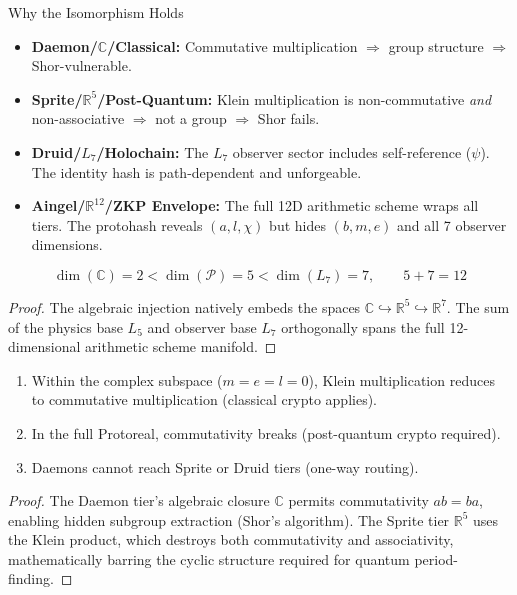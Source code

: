 \begin{aingelbox}{Why the Isomorphism Holds}
\begin{itemize}
    \item \textbf{Daemon/$\mathbb{C}$/Classical:} Commutative multiplication $\Rightarrow$ group structure $\Rightarrow$ Shor-vulnerable.
    \item \textbf{Sprite/$\mathbb{R}^5$/Post-Quantum:} Klein multiplication is non-commutative \emph{and} non-associative $\Rightarrow$ not a group $\Rightarrow$ Shor fails.
    \item \textbf{Druid/$L_7$/Holochain:} The $L_7$ observer sector includes self-reference ($\psi$). The identity hash is path-dependent and unforgeable.
    \item \textbf{Aingel/$\mathbb{R}^{12}$/ZKP Envelope:} The full 12D arithmetic scheme wraps all tiers. The protohash reveals $(a, l, \chi)$ but hides $(b, m, e)$ and all 7 observer dimensions.
\end{itemize}
\end{aingelbox}

\begin{theorem}
\begin{equation}
    \dim(\mathbb{C}) = 2 < \dim(\mathcal{P}) = 5 < \dim(L_7) = 7, \qquad 5 + 7 = 12
\end{equation}
\end{theorem}
\begin{proof}
The algebraic injection natively embeds the spaces $\mathbb{C} \hookrightarrow \mathbb{R}^5 \hookrightarrow \mathbb{R}^7$. The sum of the physics base $L_5$ and observer base $L_7$ orthogonally spans the full 12-dimensional arithmetic scheme manifold. \qedhere
\end{proof}

\begin{theorem}
\begin{enumerate}
    \item Within the complex subspace ($m = e = l = 0$), Klein multiplication reduces to commutative multiplication (classical crypto applies).
    \item In the full Protoreal, commutativity breaks (post-quantum crypto required).
    \item Daemons cannot reach Sprite or Druid tiers (one-way routing).
\end{enumerate}
\end{theorem}
\begin{proof}
The Daemon tier's algebraic closure $\mathbb{C}$ permits commutativity $ab = ba$, enabling hidden subgroup extraction (Shor's algorithm). The Sprite tier $\mathbb{R}^5$ uses the Klein product, which destroys both commutativity and associativity, mathematically barring the cyclic structure required for quantum period-finding. \qedhere
\end{proof}

